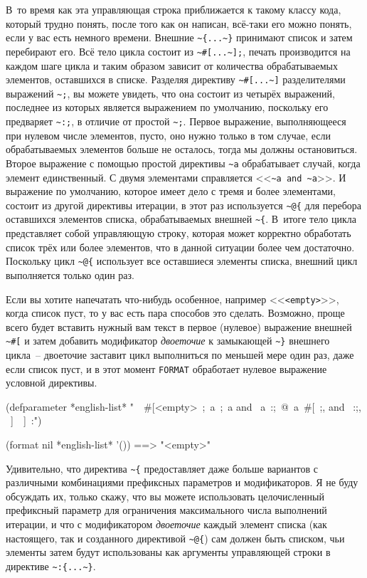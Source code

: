 В~то время как эта управляющая строка приближается к такому классу кода, который трудно понять, после того как
он написан, всё-таки его можно понять, если у вас есть немного времени. Внешние
\lstinline!~{...~}! принимают список и затем перебирают его. Всё тело цикла состоит из \lstinline!~#[...~];!, печать
производится на каждом шаге цикла и таким образом зависит от количества обрабатываемых элементов, оставшихся в
списке. Разделяя директиву \lstinline!~#[...~]! разделителями выражений \lstinline!~;!, вы можете увидеть, что она состоит из
четырёх выражений, последнее из которых является выражением по умолчанию, поскольку его предваряет \lstinline!~:;!, в
отличие от простой \lstinline!~;!. Первое выражение, выполняющееся при нулевом числе элементов, пусто, оно нужно только
в том случае, если обрабатываемых элементов больше не осталось, тогда мы должны остановиться. Второе выражение с
помощью простой директивы \lstinline!~a! обрабатывает случай, когда элемент единственный. С двумя элементами справляется
<<\lstinline!~a and ~a!>>. И выражение по умолчанию, которое имеет дело с тремя и более элементами, состоит из другой
директивы итерации, в этот раз используется \lstinline!~@{! для перебора оставшихся элементов списка, обрабатываемых внешней
\lstinline!~{!. В~итоге тело цикла представляет собой управляющую строку, которая может корректно обработать список трёх
или более элементов, что в данной ситуации более чем достаточно. Поскольку цикл \lstinline!~@{! использует все
оставшиеся элементы списка, внешний цикл выполняется только один раз.

Если вы хотите напечатать что-нибудь особенное, например <<\lstinline!<empty>!>>, когда
список пуст, то у вас есть пара способов это сделать. Возможно, проще всего будет вставить
нужный вам текст в первое (нулевое) выражение внешней \lstinline!~#[! и затем добавить
модификатор \textit{двоеточие} к замыкающей \lstinline!~}! внешнего цикла~-- двоеточие
заставит цикл выполниться по меньшей мере один раз, даже если список пуст, и в этот момент
\lstinline{FORMAT} обработает нулевое выражение условной директивы.

\begin{myverb}
(defparameter *english-list*
  "~{~#[<empty>~;~a~;~a and ~a~:;~@{~a~#[~;, and ~:;, ~]~}~]~:}")

(format nil *english-list* '()) ==> "<empty>"
\end{myverb}

Удивительно, что директива \lstinline!~{! предоставляет даже больше вариантов с различными комбинациями префиксных
параметров и модификаторов. Я не буду обсуждать их, только скажу, что вы можете использовать целочисленный
префиксный параметр для ограничения максимального числа выполнений итерации, и что с модификатором \textit{двоеточие}
каждый элемент списка (как настоящего, так и созданного директивой \lstinline!~@{!) сам должен быть списком, чьи
элементы затем будут использованы как аргументы управляющей строки в директиве \lstinline!~:{...~}!.

